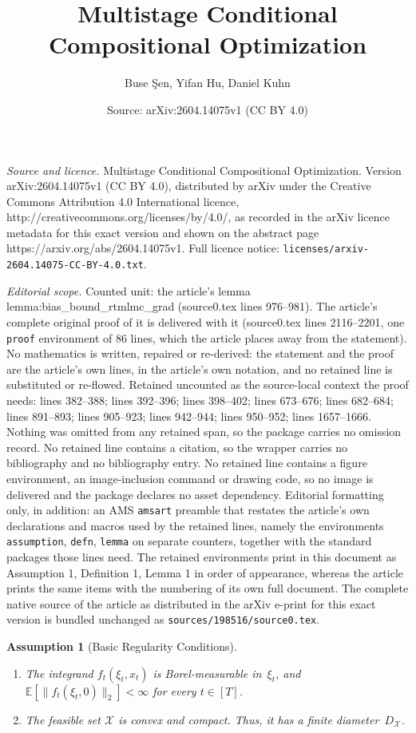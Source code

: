 \documentclass[10pt,a4paper]{amsart}
\title{Multistage Conditional Compositional Optimization}
\author{Buse \c{S}en, Yifan Hu, Daniel Kuhn}
\date{Source: arXiv:2604.14075v1 (CC BY 4.0)}
\newtheorem{assumption}{Assumption}
\newcommand{\EE}{\mathbb{E}}
\begin{document}
\maketitle

\noindent\emph{Source and licence.} Multistage Conditional Compositional Optimization. Version arXiv:2604.14075v1 (CC BY 4.0), distributed by arXiv under the Creative Commons Attribution 4.0 International licence, http://creativecommons.org/licenses/by/4.0/, as recorded in the arXiv licence metadata for this exact version and shown on the abstract page https://arxiv.org/abs/2604.14075v1. Full licence notice: \texttt{licenses/arxiv-2604.14075-CC-BY-4.0.txt}.\par\smallskip

\noindent\textit{Editorial scope.} Counted unit: the article's lemma lemma:bias\_bound\_rtmlmc\_grad (source0.tex lines 976--981). The article's complete original proof of it is delivered with it (source0.tex lines 2116--2201, one \texttt{proof} environment of 86 lines, which the article places away from the statement). No mathematics is written, repaired or re-derived: the statement and the proof are the article's own lines, in the article's own notation, and no retained line is substituted or re-flowed.  Retained uncounted as the source-local context the proof needs: lines 382--388; lines 392--396; lines 398--402; lines 673--676; lines 682--684; lines 891--893; lines 905--923; lines 942--944; lines 950--952; lines 1657--1666.  Nothing was omitted from any retained span, so the package carries no omission record.  No retained line contains a citation, so the wrapper carries no bibliography and no bibliography entry.  No retained line contains a figure environment, an image-inclusion command or drawing code, so no image is delivered and the package declares no asset dependency.  Editorial formatting only, in addition: an AMS \texttt{amsart} preamble that restates the article's own declarations and macros used by the retained lines, namely the environments \texttt{assumption}, \texttt{defn}, \texttt{lemma} on separate counters, together with the standard packages those lines need.  The retained environments print in this document as Assumption 1, Definition 1, Lemma 1 in order of appearance, whereas the article prints the same items with the numbering of its own full document.  The complete native source of the article as distributed in the arXiv e-print for this exact version is bundled unchanged as \texttt{sources/198516/source0.tex}.
\begin{assumption}[Basic Regularity Conditions] 
\label{assump:general}
\leavevmode\begin{enumerate}[label=(\roman*)]
    \item The integrand $f_t(\xi_t,x_t)$ is Borel-measurable in~$\xi_t$, and $\EE[\|f_t(\xi_t,0)\|_2]<\infty$ for every $t\in[T]$. 
    \item The feasible set $\mathcal{X}$ is convex and compact. Thus, it has a finite diameter~$D_\mathcal{X}$.
\end{enumerate}
\end{assumption}
\end{document}
